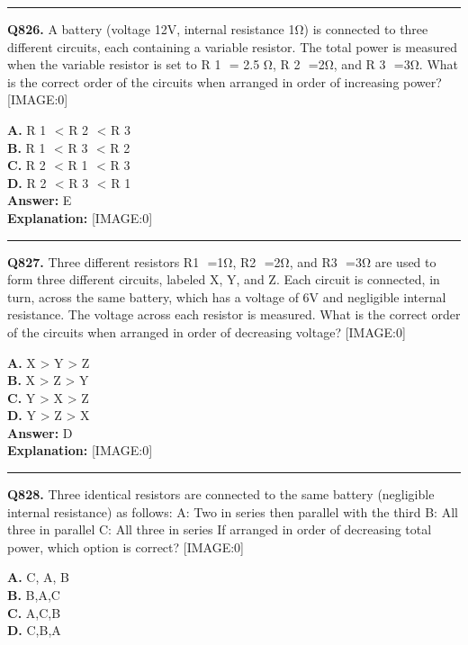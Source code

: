 \documentclass[12pt]{article}
\begin{document}
\hrule
\vspace{1em}


\noindent
\textbf{Q826.} A battery (voltage 12V, internal resistance 1Ω) is connected to three different circuits, each containing a variable resistor. The total power is measured when the variable resistor is set to
R
1
​
=
2.5
Ω,
R
2
​
=2Ω, and
R
3
​
=3Ω. What is the correct order of the circuits when arranged in order of increasing power?
[IMAGE:0]



\textbf{A.} R
1
​
<
R
2
​
<
R
3
​ \\
\textbf{B.} R
1
​
<
R
3
​
<
R
2
​ \\
\textbf{C.} R
2
​
<
R
1
​
<
R
3
​ \\
\textbf{D.} R
2
​
<
R
3
​
<
R
1 \\

\textbf{Answer:} E \\
\textbf{Explanation:} [IMAGE:0]

\hrule
\vspace{1em}


\noindent
\textbf{Q827.} Three different resistors R1
​
=1Ω, R2
​
=2Ω, and R3
​
=3Ω are used to form three different circuits, labeled X, Y, and Z. Each circuit is connected, in turn, across the same battery, which has a voltage of 6V and negligible internal resistance. The voltage across each resistor is measured. What is the correct order of the circuits when arranged in order of
decreasing
voltage?
[IMAGE:0]



\textbf{A.} X
>
Y
>
Z \\
\textbf{B.} X
>
Z
>
Y \\
\textbf{C.} Y
>
X
>
Z \\
\textbf{D.} Y
>
Z
>
X \\

\textbf{Answer:} D \\
\textbf{Explanation:} [IMAGE:0]

\hrule
\vspace{1em}


\noindent
\textbf{Q828.} Three identical resistors are connected to the same battery (negligible internal resistance) as follows:
\cdot 
A: Two in series then parallel with the third
\cdot 
B: All three in parallel
\cdot 
C: All three in series
If arranged in order of
decreasing
total power, which option is correct?
[IMAGE:0]



\textbf{A.} C, A, B \\
\textbf{B.} B,A,C \\
\textbf{C.} A,C,B \\
\textbf{D.} C,B,A \\
\end{document}
